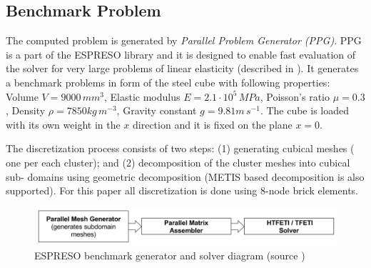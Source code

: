 \subsection{Benchmark Problem}
The computed problem is generated by \textit{Parallel Problem Generator (PPG)}. PPG is a part of the ESPRESO library and it is designed to enable fast evaluation of the solver for 
very large problems of linear elasticity (described in \cite{vriha2016massively}). 
It generates a benchmark problems in form of the 
steel cube with following properties: 
Volume $V = 9000\,mm^3$,  
Elastic modulus $E = 2.1 \cdot 10^5\,MPa$,  
Poisson's ratio $\mu = 0.3$,  
Density $\rho = 7850 kg\,m^{-3}$, 
Gravity constant $g = 9.81 m\,s^{-1}$.
The cube is loaded with its own weight in the $x$ direction and 
it is fixed on the plane $x = 0$.

The discretization process consists of two steps: (1) generating cubical meshes (
one per each cluster); and (2) decomposition of the cluster meshes into cubical sub-
domains using geometric decomposition (METIS based decomposition is also supported). 
For this paper all discretization is done using 8-node brick elements.




\begin{figure}
\centering
\includegraphics[scale=0.4]{figures/meshGen.pdf}
\caption{\label{fig:espresoMeshInp} ESPRESO benchmark generator and solver diagram (source \cite{vriha2016massively})}
\end{figure}


